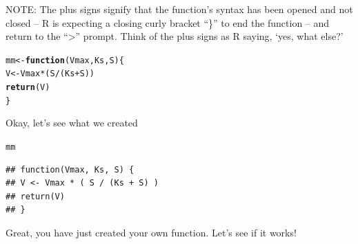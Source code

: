\documentclass{tufte-handout}\usepackage[]{graphicx}\usepackage[]{xcolor}
\makeatletter
\newcommand{\hlopt}[1]{\textcolor[rgb]{0,0,0}{#1}}%
\newcommand{\hlstd}[1]{\textcolor[rgb]{0.345,0.345,0.345}{#1}}%
\newcommand{\hlkwa}[1]{\textcolor[rgb]{0.161,0.373,0.58}{\textbf{#1}}}%
\newcommand{\hlkwb}[1]{\textcolor[rgb]{0.69,0.353,0.396}{#1}}%
\newcommand{\hlkwc}[1]{\textcolor[rgb]{0.333,0.667,0.333}{#1}}%
\newcommand{\hlkwd}[1]{\textcolor[rgb]{0.737,0.353,0.396}{\textbf{#1}}}%
\newenvironment{kframe}{%
 \def\at@end@of@kframe{}%
 \ifinner\ifhmode%
  \def\at@end@of@kframe{\end{minipage}}%
  \begin{minipage}{\columnwidth}%
 \fi\fi%
 \def\FrameCommand##1{\hskip\@totalleftmargin \hskip-\fboxsep
 \colorbox{shadecolor}{##1}\hskip-\fboxsep
     \hskip-\linewidth \hskip-\@totalleftmargin \hskip\columnwidth}%
 \MakeFramed {\advance\hsize-\width
   \@totalleftmargin\z@ \linewidth\hsize
   \@setminipage}}%
 {\par\unskip\endMakeFramed%
 \at@end@of@kframe}
\newenvironment{knitrout}{}{} %
\makeatother
\begin{document}
NOTE: The plus signs signify  that the function's syntax has been opened and not closed -- R is expecting a closing curly bracket ``\}'' to end the function -- and return to the ``>'' prompt. Think of the plus signs as R saying, `yes, what else?'

\begin{knitrout}
\color{fgcolor}\begin{kframe}
\begin{alltt}
\hlstd{mm} \hlkwb{<-} \hlkwa{function}\hlstd{(}\hlkwc{Vmax}\hlstd{,} \hlkwc{Ks}\hlstd{,} \hlkwc{S}\hlstd{) \{}
\hlstd{V} \hlkwb{<-} \hlstd{Vmax} \hlopt{*} \hlstd{( S} \hlopt{/} \hlstd{(Ks} \hlopt{+} \hlstd{S) )}
\hlkwd{return}\hlstd{(V)}
\hlstd{\}}
\end{alltt}
\end{kframe}
\end{knitrout}

Okay, let's see what we created

\begin{knitrout}
\color{fgcolor}\begin{kframe}
\begin{alltt}
\hlstd{mm}
\end{alltt}
\begin{verbatim}
## function(Vmax, Ks, S) {
## V <- Vmax * ( S / (Ks + S) )
## return(V)
## }
\end{verbatim}
\end{kframe}
\end{knitrout}

Great, you have just created your own function. Let's see if it works!
\end{document}
